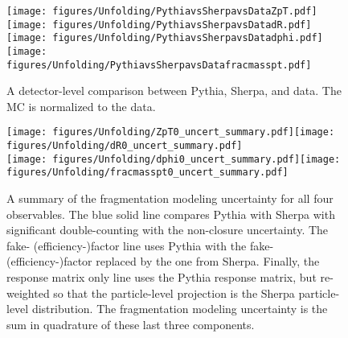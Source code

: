 \begin{figure}[htpb!]
\begin{center}
\texttt{[image: figures/Unfolding/PythiavsSherpavsDataZpT.pdf]}\texttt{[image: figures/Unfolding/PythiavsSherpavsDatadR.pdf]}\\
\texttt{[image: figures/Unfolding/PythiavsSherpavsDatadphi.pdf]}\texttt{[image: figures/Unfolding/PythiavsSherpavsDatafracmasspt.pdf]}
\caption[]{A detector-level comparison between Pythia, Sherpa, and data.  The MC is normalized to the data.} 
\label{fig:frag2}
\end{center}
\end{figure}
  
  \begin{figure}[htpb!]
\begin{center}
\texttt{[image: figures/Unfolding/ZpT0\_uncert\_summary.pdf]}\texttt{[image: figures/Unfolding/dR0\_uncert\_summary.pdf]}\\
\texttt{[image: figures/Unfolding/dphi0\_uncert\_summary.pdf]}\texttt{[image: figures/Unfolding/fracmasspt0\_uncert\_summary.pdf]}
\caption[]{A summary of the fragmentation modeling uncertainty for all four observables.  The blue solid line compares Pythia with Sherpa with significant double-counting with the non-closure uncertainty.  The fake- (efficiency-)factor line uses Pythia with the fake- (efficiency-)factor replaced by the one from Sherpa.  Finally, the response matrix only line uses the Pythia response matrix, but re-weighted so that the particle-level projection is the Sherpa particle-level distribution.  The fragmentation modeling uncertainty is the sum in quadrature of these last three components. } 
\label{fig:syst_overview_deltaR2frag}
\end{center}
\end{figure}

